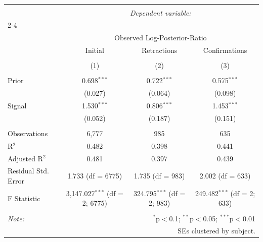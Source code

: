 
\begin{table}[!htbp] \centering 
  \caption{} 
  \label{} 
\begin{tabular}{@{\extracolsep{5pt}}lccc} 
\\[-1.8ex]\hline 
\hline \\[-1.8ex] 
 & \multicolumn{3}{c}{\textit{Dependent variable:}} \\ 
\cline{2-4} 
\\[-1.8ex] & \multicolumn{3}{c}{Observed Log-Posterior-Ratio} \\ 
 & Initial & Retractions & Confirmations \\ 
\\[-1.8ex] & (1) & (2) & (3)\\ 
\hline \\[-1.8ex] 
 Prior & 0.698$^{***}$ & 0.722$^{***}$ & 0.575$^{***}$ \\ 
  & (0.027) & (0.064) & (0.098) \\ 
  Signal & 1.530$^{***}$ & 0.806$^{***}$ & 1.453$^{***}$ \\ 
  & (0.052) & (0.187) & (0.151) \\ 
 \hline \\[-1.8ex] 
Observations & 6,777 & 985 & 635 \\ 
R$^{2}$ & 0.482 & 0.398 & 0.441 \\ 
Adjusted R$^{2}$ & 0.481 & 0.397 & 0.439 \\ 
Residual Std. Error & 1.733 (df = 6775) & 1.735 (df = 983) & 2.002 (df = 633) \\ 
F Statistic & 3,147.027$^{***}$ (df = 2; 6775) & 324.795$^{***}$ (df = 2; 983) & 249.482$^{***}$ (df = 2; 633) \\ 
\hline 
\hline \\[-1.8ex] 
\textit{Note:}  & \multicolumn{3}{r}{$^{*}$p$<$0.1; $^{**}$p$<$0.05; $^{***}$p$<$0.01} \\ 
 & \multicolumn{3}{r}{SEs clustered by subject.} \\ 
\end{tabular} 
\end{table} 
